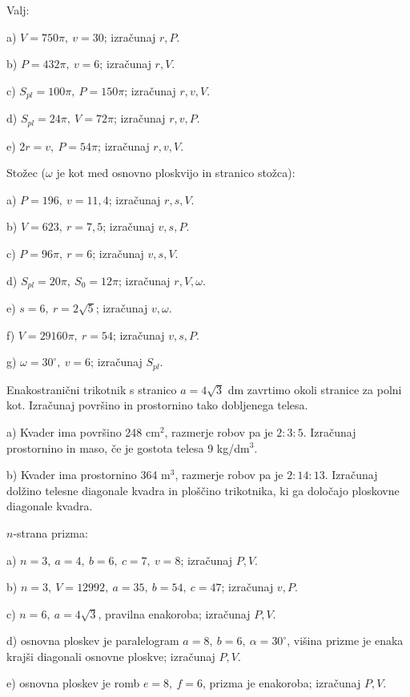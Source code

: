 \documentclass[a4paper,11pt]{letter}
\begin{document}
\begin{naloga}
Valj:

a) $V=750\pi,\ v=30$; \quad izračunaj $r,P$.

b) $P=432\pi,\ v=6$; \quad izračunaj $r,V$.

c) $S_{pl}=100\pi,\ P=150\pi$; \quad izračunaj $r,v,V$.

d) $S_{pl}=24\pi,\ V=72\pi$; \quad izračunaj $r,v,P$.

e) $2r=v,\ P=54\pi$; \quad izračunaj $r,v,V$.
\end{naloga}
\begin{naloga}
Stožec ($\omega$ je kot med osnovno ploskvijo in stranico stožca):

a) $P=196,\ v=11{,}4$; \quad izračunaj $r,s,V$.

b) $V=623,\ r=7{,}5$; \quad izračunaj $v,s,P$.

c) $P=96\pi,\ r=6$; \quad izračunaj $v,s,V$.

d) $S_{pl}=20\pi,\ S_0=12\pi$; \quad izračunaj $r,V,\omega$.

e) $s=6,\ r=2\sqrt{5}$; \quad izračunaj $v,\omega$.

f) $V=29160\pi,\ r=54$; \quad izračunaj $v,s,P$.

g) $\omega=30^{\circ},\ v=6$; \quad izračunaj $S_{pl}$.
\end{naloga}

\begin{naloga}
Enakostranični trikotnik s stranico $a=4\sqrt{3}$ dm zavrtimo okoli stranice za polni kot.
Izračunaj površino in prostornino tako dobljenega telesa.
\end{naloga}

\begin{naloga}
a) Kvader ima površino 248 cm$^2$, razmerje robov pa je $2:3:5$.
Izračunaj prostornino in maso, če je gostota telesa 9 kg/dm$^3$.

b) Kvader ima prostornino 364 m$^3$, razmerje robov pa je $2:14:13$.
Izračunaj dolžino telesne diagonale kvadra in ploščino trikotnika, ki ga določajo
ploskovne diagonale kvadra.
\end{naloga}

\begin{naloga}
$n$-strana prizma:

a) $n=3,\ a=4,\ b=6,\ c=7,\ v=8$; \quad izračunaj $P,V$.

b) $n=3,\ V=12992,\ a=35,\ b=54,\ c=47$; \quad izračunaj $v,P$.

c) $n=6,\ a=4\sqrt{3}$, pravilna enakoroba; \quad izračunaj $P,V$.

d) osnovna ploskev je paralelogram $a=8,\ b=6,\ \alpha=30^{\circ}$,
višina prizme je enaka krajši diagonali osnovne ploskve; \quad izračunaj $P,V$.

e) osnovna ploskev je romb $e=8,\ f=6$, prizma je enakoroba; \quad izračunaj $P,V$.
\end{naloga}
\end{document}
